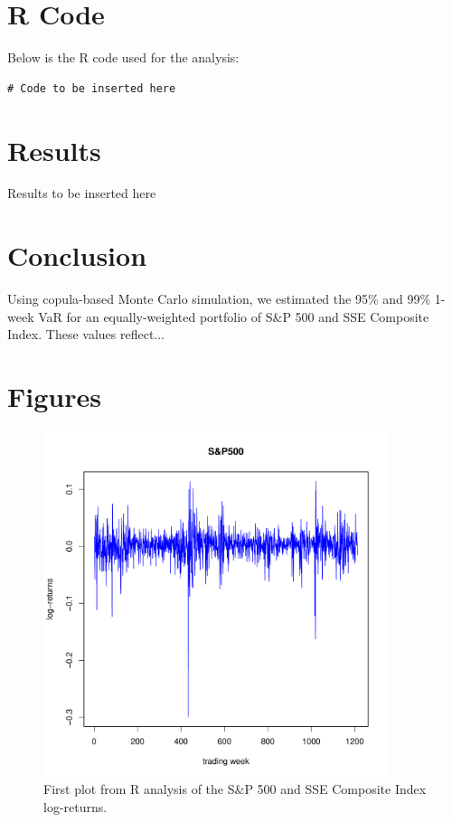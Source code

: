 \documentclass[a4paper,10pt]{article}
\begin{document}
\section{R Code}
Below is the R code used for the analysis:

\begin{lstlisting}
# Code to be inserted here
\end{lstlisting}

\section{Results}
Results to be inserted here

\section{Conclusion}
Using copula-based Monte Carlo simulation, we estimated the 95\% and 99\% 1-week VaR for an equally-weighted portfolio of S\&P 500 and SSE Composite Index. These values reflect...

\section{Figures}
\begin{figure}[h]
    \centering
    \includegraphics[width=0.9\textwidth, page=1]{Rplots.pdf}
    \caption{First plot from R analysis of the S\&P 500 and SSE Composite Index log-returns.}
    \label{fig:rplots1}
\end{figure}
\end{document}

